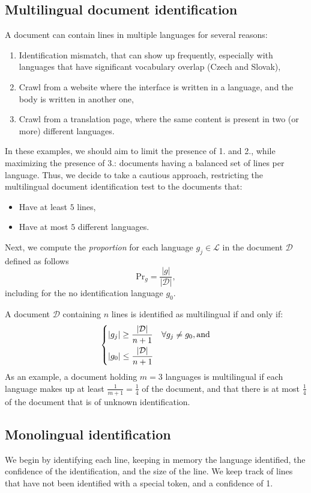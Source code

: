 \subsection{Multilingual document identification}

A document can contain lines in multiple languages for several reasons:
\begin{enumerate}
    \item Identification mismatch, that can show up frequently, especially with languages that have significant vocabulary overlap (Czech and Slovak),
    \item Crawl from a website where the interface is written in a language, and the body is written in another one,
    \item Crawl from a translation page, where the same content is present in two (or more) different languages.
\end{enumerate}

In these examples, we should aim to limit the presence of 1. and 2., while maximizing the presence of 3.: documents having a balanced set of lines per language. Thus, we decide to take a cautious approach, restricting the multilingual document identification test to the documents that:
\begin{itemize}
    \item Have at least $5$ lines,
    \item Have at most $5$ different languages.
\end{itemize}
Next, we compute the \emph{proportion} for each language $g_j \in \mathscr{L}$ in the document $\mathcal{D}$ defined as follows
\[
    \mathrm{Pr}_g = \frac{|g|}{|\mathcal{D}|},
\]
including for the no identification language $g_0$.

A document $\mathcal{D}$ containing $n$ lines is identified as multilingual if and only if:
\[
    \begin{dcases}
        |g_j| \ge \frac{|\mathcal{D}|}{n+1} & \forall g_j \neq g_0, \text{and} \\
        |g_0| \le \frac{|\mathcal{D}|}{n+1}
    \end{dcases}
\]
As an example, a document holding $m=3$ languages is multilingual if each language makes up at least $\frac{1}{m+1} = \frac{1}{4}$ of the document, and that there is at most $\frac{1}{4}$ of the document that is of unknown identification.

\subsection{Monolingual identification}
We begin by identifying each line, keeping in memory the language identified, the confidence of the identification, and the size of the line. We keep track of lines that have not been identified with a special token, and a confidence of 1.


